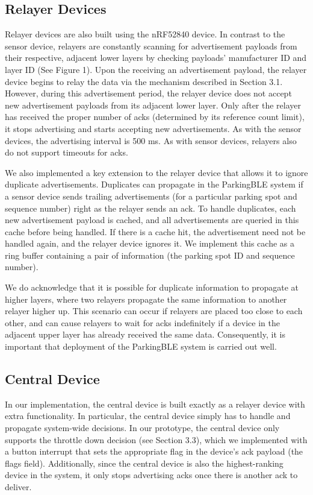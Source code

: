 \documentclass[sigconf]{acmart}
\begin{document}
\subsection{Relayer Devices}
Relayer devices are also built using the nRF52840 device. In contrast to
the sensor device, relayers are constantly scanning for advertisement
payloads from their respective, adjacent lower layers by checking payloads'
manufacturer ID and layer ID (See Figure 1). Upon the receiving an advertisement payload,
the relayer device begins to relay the data via the mechanism described in
Section 3.1. However, during this advertisement period, the relayer device
does not accept new advertisement payloads from its adjacent lower layer.
Only after the relayer has received the proper
number of acks (determined by its reference count limit), it stops
advertising and starts accepting new advertisements. As with the sensor
devices, the advertising interval is 500 ms. As with sensor devices, relayers
also do not support timeouts for acks. \newline

We also implemented a key extension to the relayer device that allows it
to ignore duplicate advertisements. Duplicates can propagate in the ParkingBLE
system if a sensor device sends trailing advertisements (for a particular
parking spot and sequence number) right as the relayer sends an ack. To
handle duplicates, each new advertisement payload is cached, and all
advertisements are queried in this cache before being handled. If there is
a cache hit, the advertisement need not be handled again, and the relayer
device ignores it. We implement this cache as a ring buffer containing
a pair of information (the parking spot ID and sequence number). \newline

We do acknowledge that it is possible for duplicate information to propagate
at higher layers, where two relayers propagate the same information to
another relayer higher up. This scenario can occur if relayers are placed
too close to each other, and can cause relayers to wait for acks indefinitely
if a device in the adjacent upper layer has already received the same data.
Consequently, it is important that deployment of the ParkingBLE system is
carried out well.

\subsection{Central Device}
In our implementation, the central device is built exactly as a relayer
device with extra functionality. In particular, the central device simply
has to handle and propagate system-wide decisions. In our prototype, the
central device only supports the throttle down decision (see
Section 3.3), which we implemented with a button interrupt that sets
the appropriate flag in the device's ack payload (the flags field).
Additionally, since the central device is also the highest-ranking
device in the system, it only stops advertising acks once there is
another ack to deliver.
\end{document}
